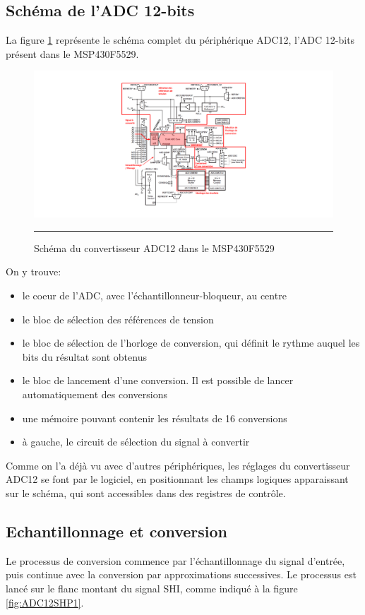 \subsection{Schéma de l'ADC 12-bits}
La figure \ref{fig:ADC_Schema} représente le schéma complet du périphérique ADC12, l'ADC 12-bits présent dans le MSP430F5529. 

\begin{figure}[H]
  \centering
  \includegraphics [angle=0, width=16cm]{./Figures/Chap11_ADC/ADC_Schema.pdf}
  \rule{35em}{0.5pt}
  \caption{Schéma du convertisseur ADC12 dans le MSP430F5529}
  \label{fig:ADC_Schema}
\end{figure}

On y trouve:
\begin{itemize}[label=\textbullet,font=\small]
\item le coeur de l'ADC, avec l'échantillonneur-bloqueur, au centre
\item le bloc de sélection des références de tension
\item le bloc de sélection de l'horloge de conversion, qui définit le rythme auquel les bits du résultat sont obtenus
\item le bloc de lancement d'une conversion. Il est possible de lancer automatiquement des conversions
\item une mémoire pouvant contenir les résultats de 16 conversions
\item à gauche, le circuit de sélection du signal à convertir
\end{itemize}

Comme on l'a déjà vu avec d'autres périphériques, les réglages du convertisseur ADC12 se font par le logiciel, en positionnant les champs logiques apparaissant sur le schéma, qui sont accessibles dans des registres de contrôle.

\pagebreak
\subsection{Echantillonnage et conversion}
Le processus de conversion commence par l'échantillonnage du signal d'entrée, puis continue avec la conversion par approximations successives. Le processus est lancé sur le flanc montant du signal SHI, comme indiqué à la figure \ref{fig:ADC12SHP1}.

